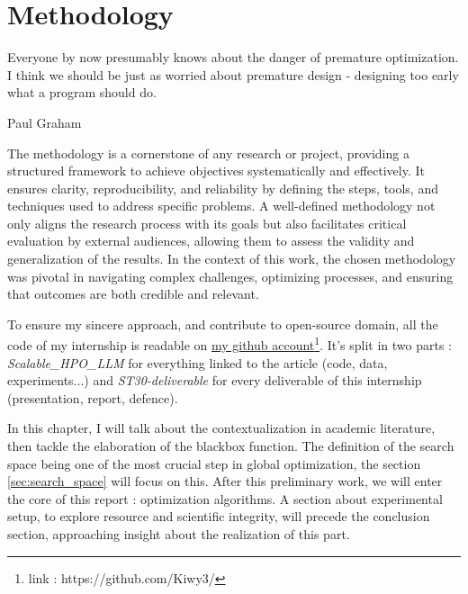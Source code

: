 \chapter{Methodology}
\label{chap:methodo}


\epigraph{Everyone by now presumably knows about the danger of premature optimization. I think we should be just as worried about premature design - designing too early what a program should do.}{Paul Graham}

The methodology is a cornerstone of any research or project, providing a structured framework to achieve objectives systematically and effectively. It ensures clarity, reproducibility, and reliability by defining the steps, tools, and techniques used to address specific problems. A well-defined methodology not only aligns the research process with its goals but also facilitates critical evaluation by external audiences, allowing them to assess the validity and generalization of the results. In the context of this work, the chosen methodology was pivotal in navigating complex challenges, optimizing processes, and ensuring that outcomes are both credible and relevant.


To ensure my sincere approach, and contribute to open-source domain, all the code of my internship is readable on \href{https://github.com/Kiwy3/}{my github account}\footnote{link : https://github.com/Kiwy3/}. It's split in two parts : \textit{Scalable\_HPO\_LLM} for everything linked to the article (code, data, experiments...) and \textit{ST30-deliverable} for every deliverable of this internship (presentation, report, defence).

In this chapter, I will talk about the contextualization in academic literature, then tackle the elaboration of the blackbox function. The definition of the search space being one of the most crucial step in global optimization, the section \ref{sec:search_space} will focus on this. After this preliminary work, we will enter the core of this report : optimization algorithms. A section about experimental setup, to explore resource and scientific integrity, will precede the conclusion section, approaching insight about the realization of this part.


